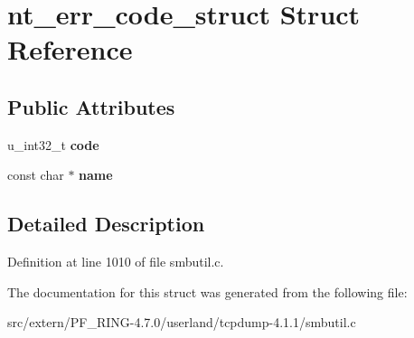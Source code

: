 \hypertarget{structnt__err__code__struct}{
\section{nt\_\-err\_\-code\_\-struct Struct Reference}
\label{structnt__err__code__struct}
}
\subsection*{Public Attributes}
\begin{DoxyCompactItemize}
\item 
\hypertarget{structnt__err__code__struct_ae4b7ddb2d52e81dc02d3d77dc6b62eaf}{
u\_\-int32\_\-t {\bfseries code}}
\label{structnt__err__code__struct_ae4b7ddb2d52e81dc02d3d77dc6b62eaf}

\item 
\hypertarget{structnt__err__code__struct_a7c84ec906a2be01d579efe8010211d72}{
const char $\ast$ {\bfseries name}}
\label{structnt__err__code__struct_a7c84ec906a2be01d579efe8010211d72}

\end{DoxyCompactItemize}


\subsection{Detailed Description}


Definition at line 1010 of file smbutil.c.



The documentation for this struct was generated from the following file:\begin{DoxyCompactItemize}
\item 
src/extern/PF\_\-RING-\/4.7.0/userland/tcpdump-\/4.1.1/smbutil.c\end{DoxyCompactItemize}
